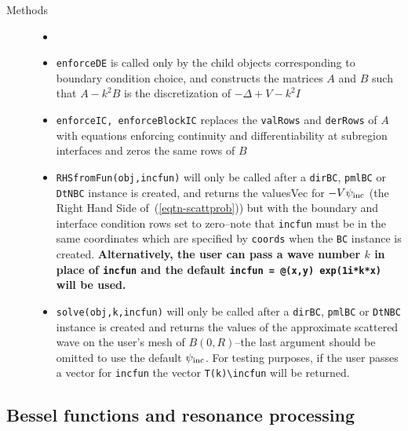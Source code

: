 \begin{description}
 \item[Methods]
   \begin{itemize}
    \item[] %
    \item {\tt enforceDE} is called only by the child objects
          corresponding to boundary condition choice, and constructs
          the matrices $A$ and $B$ such that $A-k^2B$ is the discretization
          of $-\Delta + V - k^2 I$
    \item {\tt enforceIC, enforceBlockIC}
          replaces the {\tt valRows} and {\tt derRows} of $A$ with
          equations enforcing continuity and differentiability 
          at subregion interfaces and zeros the same rows of $B$
    \item {\tt RHSfromFun(obj,incfun)} will only be called
          after a {\tt dirBC}, {\tt pmlBC} or {\tt DtNBC}
          instance is created, and returns
          the valuesVec for $-V\psi_{\text{inc}}$ 
          (the Right Hand Side of~(\ref{eqtn-scattprob}))
          but with the boundary and
          interface condition rows set to zero--note that 
          {\tt incfun} must be in the same
          coordinates which are specified by {\tt coords}
          when the {\tt *BC} instance is created.
          {\bf Alternatively, the user can pass a wave number $k$
          in place of {\tt incfun}
          and the default {\tt incfun = @(x,y) exp(1i*k*x)} will be used.}
    \item {\tt solve(obj,k,incfun)} will only be called after
          a {\tt dirBC}, {\tt pmlBC} or {\tt DtNBC} instance
          is created and returns the values of the approximate scattered
          wave on the user's mesh of $B(0,R)$--the last argument should
          be omitted to use the default $\psi_{\text{inc}}$. For testing purposes,
          if the user passes a vector for {\tt incfun} the
          vector {\tt T(k)\textbackslash incfun} will be returned.
   \end{itemize}
\end{description}

\subsection{Bessel functions and resonance processing}
\label{sec-scattResComp2d-bessel}

